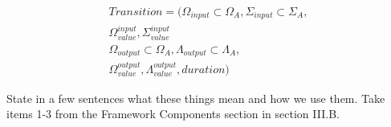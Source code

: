 \begin{equation}
\begin{split}
	Transition = (\Omega_{input} \subset \Omega_A, \Sigma_{input} \subset \Sigma_A,\\
	\Omega_{value}^{input}, \Sigma_{value}^{input} \\
	\Omega_{output} \subset \Omega_A, \Lambda_{output} \subset \Lambda_A, \\
	\Omega_{value}^{output}, \Lambda_{value}^{output}, duration)
 \label{eq:transition}
 \end{split}
\end{equation}

{\sc State in a few sentences what these things mean and how we use them.  Take items 1-3 from the Framework Components section in section III.B.}
